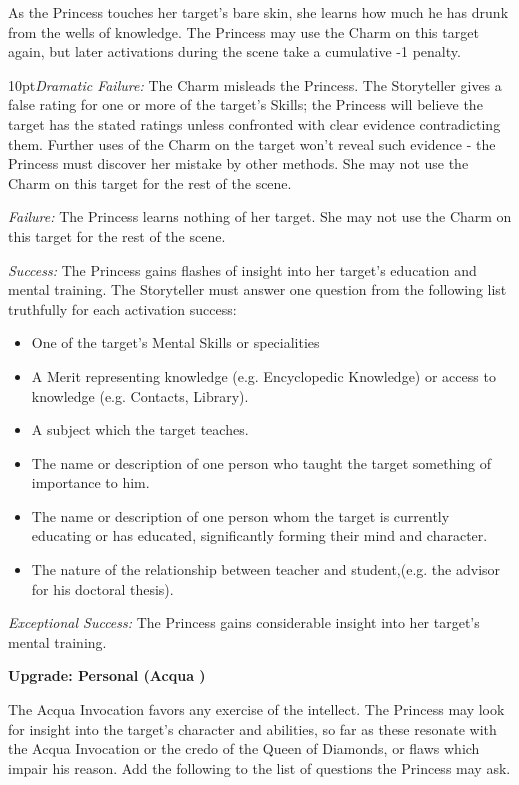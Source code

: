 \noindent As the Princess touches her target's bare skin, she learns how much he has drunk from the wells of knowledge. The Princess may use the Charm on this target again, but later activations during the scene take a cumulative -1 penalty.


\begin{myindentpar}{10pt}\emph{Dramatic Failure:} The Charm misleads the Princess. The Storyteller gives a false rating for one or more of the target's Skills; the Princess will believe the target has the stated ratings unless confronted with clear evidence contradicting them. Further uses of the Charm on the target won't reveal such evidence - the Princess must discover her mistake by other methods. She may not use the Charm on this target for the rest of the scene.

\emph{Failure:} The Princess learns nothing of her target. She may not use the Charm on this target for the rest of the scene.

\emph{Success:} The Princess gains flashes of insight into her target's education and mental training. The Storyteller must answer one question from the following list truthfully for each activation success:

\begin{itemize}
 \item One of the target's Mental Skills or specialities
 \item A Merit representing knowledge (e.g. Encyclopedic Knowledge) or access to knowledge (e.g. Contacts, Library).
 \item A subject which the target teaches. 
 \item The name or description of one person who taught the target something of importance to him. 
 \item The name or description of one person whom the target is currently educating or has educated, significantly forming their mind and character.
 \item The nature of the relationship between teacher and student,(e.g. the advisor for his doctoral thesis).
\end{itemize}

\emph{Exceptional Success:} The Princess gains considerable insight into her target's mental training.

\textbf{Upgrade: Personal (Acqua \textbullet\textbullet)}

The Acqua Invocation favors any exercise of the intellect. The Princess may look for insight into the target's character and abilities, so far as these resonate with the Acqua Invocation or the credo of the Queen of Diamonds, or flaws which impair his reason. Add the following to the list of questions the Princess may ask.\end{myindentpar}

